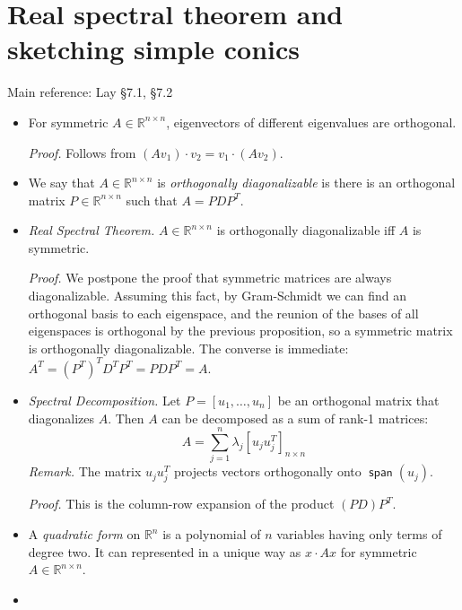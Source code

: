 \documentclass[11pt]{article}
\newcommand{\1}{\mathbf{1}}
\newcommand{\0}{\mathbf{0}}
\newcommand{\R}{\mathbb{R}}
\DeclareMathOperator{\myspan}{\mathsf{span}}
\DeclareMathOperator{\mydot}{\boldsymbol{\cdot}}
\newcommand{\spitem}{\item[$\circ$]}
\begin{document}
\clearpage
\section{Real spectral theorem and sketching simple conics}

Main reference:
Lay \S7.1, \S7.2

\begin{itemize}

\item

For symmetric $A \in \R^{n \times n}$, eigenvectors of different eigenvalues are orthogonal.

\emph{Proof.}
Follows from $(A v_1) \mydot v_2 = v_1 \mydot (A v_2)$.

\item

We say that $A \in \R^{n \times n}$ is \emph{orthogonally diagonalizable} is there is an orthogonal matrix $P \in \R^{n \times n}$ such that $A = PDP^T$.

\item

\emph{Real Spectral Theorem.}
$A \in \R^{n \times n}$ is orthogonally diagonalizable iff $A$ is symmetric.

\emph{Proof.}
We postpone the proof that symmetric matrices are always diagonalizable.
Assuming this fact, by Gram-Schmidt we can find an orthogonal basis to each eigenspace, and the reunion of the bases of all eigenspaces is orthogonal by the previous proposition, so a symmetric matrix is orthogonally diagonalizable.
The converse is immediate: $ A^T = (P^T)^T D^T P^T = PDP^T = A $.

\item

\emph{Spectral Decomposition.}
Let $P=[u_1,\dots,u_n]$ be an orthogonal matrix that diagonalizes $A$.
Then $A$ can be decomposed as a sum of rank-1 matrices:
\[
A = \sum_{j=1}^n \lambda_j [u_j u_j^T]_{n \times n}
\]
\emph{Remark.}
The matrix $ u_j u_j^T $ projects vectors orthogonally onto $\myspan(u_j)$.

\emph{Proof.}
This is the column-row expansion of the product $(PD)P^T$.

\spitem

A \emph{quadratic form} on $\R^n$ is a polynomial of $n$ variables having only terms of degree two. It can represented in a unique way as $x \mydot A x$ for symmetric $A \in \R^{n \times n}$.

\item


\end{itemize}
\end{document}
